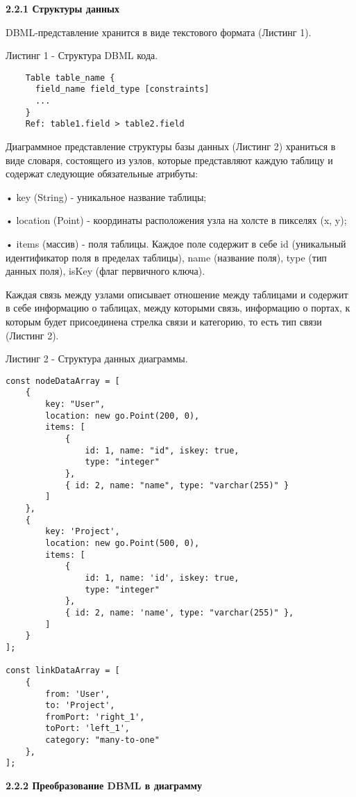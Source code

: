\textbf{2.2.1 Структуры данных}

DBML-представление хранится в виде текстового формата (Листинг 1).

Листинг 1 - Структура DBML кода.
\begin{lstlisting}
    Table table_name {
      field_name field_type [constraints]
      ...
    }
    Ref: table1.field > table2.field
\end{lstlisting}

Диаграммное представление структуры базы данных (Листинг 2) храниться в виде словаря, состоящего из узлов, которые представляют каждую таблицу  и содержат следующие обязательные атрибуты:

• key (String) - уникальное название таблицы;

• location (Point) - координаты расположения узла на холсте в пикселях (x, y);

• items (массив) - поля таблицы. Каждое поле содержит в себе id (уникальный идентификатор поля в пределах таблицы), name (название поля), type (тип данных поля), isKey (флаг первичного ключа). 

Каждая связь между узлами описывает отношение между таблицами и содержит в себе информацию о таблицах, между которыми связь, информацию о портах, к которым будет присоединена стрелка связи и категорию, то есть тип связи (Листинг 2). 

Листинг 2 - Структура данных диаграммы.
\begin{lstlisting}[label=some-code]
const nodeDataArray = [
    {
        key: "User",
        location: new go.Point(200, 0),
        items: [
            {
                id: 1, name: "id", iskey: true,
                type: "integer"
            },
            { id: 2, name: "name", type: "varchar(255)" }
        ]
    },
    {
        key: 'Project',
        location: new go.Point(500, 0),
        items: [
            {
                id: 1, name: 'id', iskey: true,
                type: "integer"
            },
            { id: 2, name: 'name', type: "varchar(255)" },
        ]
    }
];

const linkDataArray = [
    {
        from: 'User',
        to: 'Project',
        fromPort: 'right_1',
        toPort: 'left_1',
        category: "many-to-one"
    },
];
\end{lstlisting}

\textbf{2.2.2 Преобразование DBML в диаграмму}


